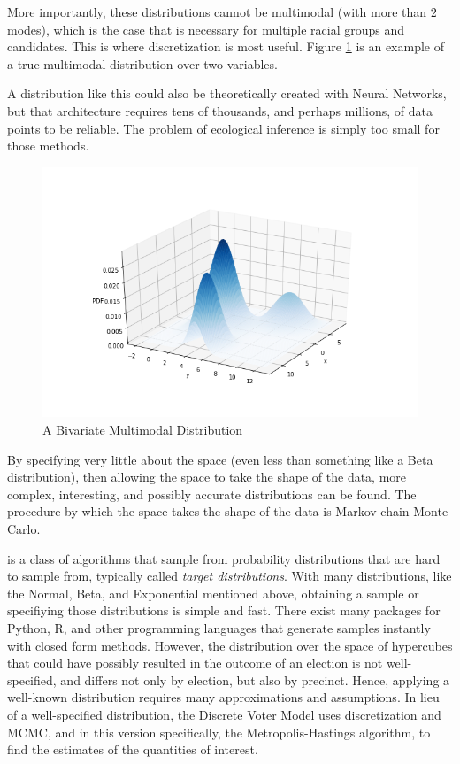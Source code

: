 More importantly, these distributions cannot be multimodal (with more than $2$ modes), which is the case that is necessary for multiple racial groups and candidates. This is where discretization is most useful. Figure \ref{fig:multimodal_example} is an example of a true multimodal distribution over two variables.

A distribution like this could also be theoretically created with Neural Networks, but that architecture requires tens of thousands, and perhaps millions, of data points to be reliable. The problem of ecological inference is simply too small for those methods.

\begin{figure}[ht]\centering
 \includegraphics[width=\linewidth]{figures/multimodal_example.png}
 \caption{A Bivariate Multimodal Distribution}
 \label{fig:multimodal_example}
\end{figure}

By specifying very little about the space (even less than something like a Beta distribution), then allowing the space to take the shape of the data, more complex, interesting, and possibly accurate distributions can be found. The procedure by which the space takes the shape of the data is Markov chain Monte Carlo.



 is a class of algorithms that sample from probability distributions that are hard to sample from, typically called \emph{target distributions}.\cite{mcmc_history} With many distributions, like the Normal, Beta, and Exponential mentioned above, obtaining a sample or specifiying those distributions is simple and fast. There exist many packages for Python, R, and other programming languages that generate samples instantly with closed form methods. However, the distribution over the space of hypercubes that could have possibly resulted in the outcome of an election is not well-specified, and differs not only by election, but also by precinct. Hence, applying a well-known distribution requires many approximations and assumptions. In lieu of a well-specified distribution, the Discrete Voter Model uses discretization and MCMC, and in this version specifically, the Metropolis-Hastings algorithm, to find the estimates of the quantities of interest.


